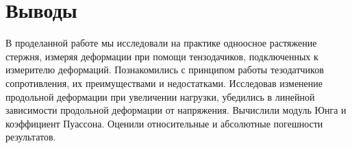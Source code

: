 \documentclass[12pt, a4paper]{article}
\begin{document}
    \newpage
    
    \section{Выводы}
    
    В проделанной работе мы исследовали на практике одноосное растяжение стержня, измеряя деформации при помощи тензодачиков, подключенных к измерителю деформаций. Познакомились с принципом работы тезодатчиков сопротивления, их преимуществами и недостатками. Исследовав изменение продольной деформации при увеличении нагрузки, убедились в линейной зависимости продольной деформации от напряжения. Вычислили модуль Юнга и коэффициент Пуассона. Оценили относительные и абсолютные погешности результатов.
    
\end{document}
